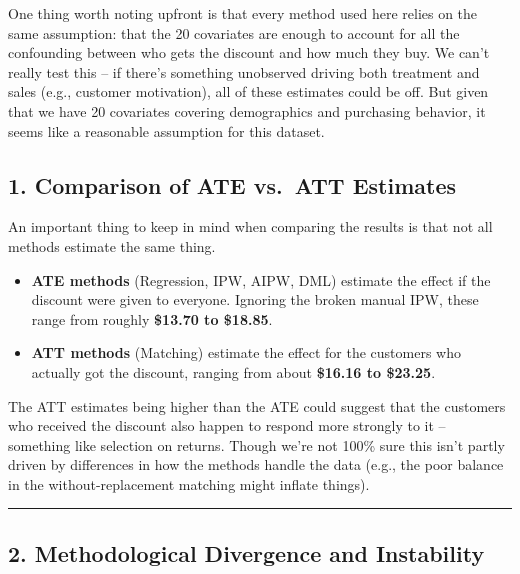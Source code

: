 \documentclass[
  letterpaper,
  DIV=11,
  numbers=noendperiod]{scrartcl}
\providecommand{\tightlist}{%
  \setlength{\itemsep}{0pt}\setlength{\parskip}{0pt}}
\begin{document}
One thing worth noting upfront is that every method used here relies on
the same assumption: that the 20 covariates are enough to account for
all the confounding between who gets the discount and how much they buy.
We can't really test this -- if there's something unobserved driving
both treatment and sales (e.g., customer motivation), all of these
estimates could be off. But given that we have 20 covariates covering
demographics and purchasing behavior, it seems like a reasonable
assumption for this dataset.

\subsection{1. Comparison of ATE vs.~ATT
Estimates}\label{comparison-of-ate-vs.-att-estimates}

An important thing to keep in mind when comparing the results is that
not all methods estimate the same thing.

\begin{itemize}
\tightlist
\item
  \textbf{ATE methods} (Regression, IPW, AIPW, DML) estimate the effect
  if the discount were given to everyone. Ignoring the broken manual
  IPW, these range from roughly \textbf{\$13.70 to \$18.85}.
\item
  \textbf{ATT methods} (Matching) estimate the effect for the customers
  who actually got the discount, ranging from about \textbf{\$16.16 to
  \$23.25}.
\end{itemize}

The ATT estimates being higher than the ATE could suggest that the
customers who received the discount also happen to respond more strongly
to it -- something like selection on returns. Though we're not 100\%
sure this isn't partly driven by differences in how the methods handle
the data (e.g., the poor balance in the without-replacement matching
might inflate things).

\begin{center}\rule{0.5\linewidth}{0.5pt}\end{center}

\subsection{2. Methodological Divergence and
Instability}\label{methodological-divergence-and-instability}
\end{document}

